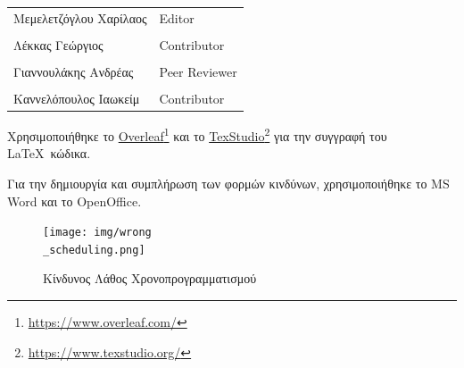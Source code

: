 \documentclass{../ol-softwaremanual}
\newcommand{\doclink}[2]{\href{#1}{#2}\footnote{\url{#1}}}
\begin{document}
	
	\vspace{20pt}
	
	\begin{table}[htbp!]
		\begin{tabular}{ll}
			Μεμελετζόγλου Χαρίλαος & \en Editor \\
			\\ Λέκκας Γεώργιος      &   \en  Contributor \\
			\\ Γιαννουλάκης Ανδρέας & \en Peer Reviewer \\
			\\ Καννελόπουλος Ιαωκείμ & \en Contributor \\ 
		\end{tabular}
	\end{table}
	
	
	\vspace{20pt}
	
	
	\vspace{20pt}
	\flushleft
Χρησιμοποιήθηκε το \en \doclink{https://www.overleaf.com/}{Overleaf} \gr και το \en \doclink{https://www.texstudio.org/}{TexStudio} \gr για την συγγραφή του \LaTeX\ κώδικα. \break

Για την δημιουργία και συμπλήρωση των φορμών κινδύνων, χρησιμοποιήθηκε το \en MS Word \gr και το \en OpenOffice\gr.


	

	\newpage 
	
		
		\flushleft
		
		\begin{figure}[htbp!]
			\texttt{[image: img/wrong\\\_scheduling.png]}
			\caption{Κίνδυνος Λάθος Χρονοπρογραμματισμού}
		\end{figure}
	
		\newpage
		
		
	
\end{document}
